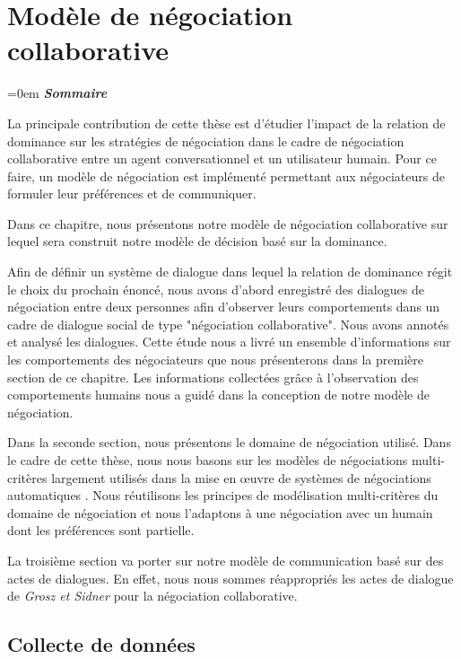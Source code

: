 	\chapter{Modèle de négociation collaborative}
	\label{chap:chap3}
	\begingroup
	\parindent=0em
	\emph{\textbf{Sommaire}}
	\localtableofcontents 
	\clearpage
	\endgroup
	
	La principale contribution de cette thèse est d'étudier l'impact de la relation de dominance sur les stratégies de négociation dans le cadre de négociation collaborative entre un agent conversationnel et un utilisateur humain. 
	Pour ce faire, un modèle de négociation est implémenté permettant aux négociateurs de formuler leur préférences et de communiquer. 
	
	Dans ce chapitre, nous présentons notre modèle de négociation collaborative sur lequel sera construit notre modèle de décision basé sur la dominance. 
	
	Afin de définir un système de dialogue dans lequel la relation de dominance régit le choix du prochain énoncé, nous avons d'abord enregistré des dialogues de négociation entre deux personnes afin d'observer leurs comportements dans un cadre de dialogue social de type "négociation collaborative". Nous avons annotés et analysé les dialogues. Cette étude nous a livré un ensemble d'informations sur les comportements des négociateurs que nous présenterons dans la première section de ce chapitre. 
	Les informations collectées grâce à l'observation des comportements humains nous a guidé dans la conception de notre modèle de négociation.
	
	Dans la seconde section, nous présentons le domaine de négociation utilisé. Dans le cadre de cette thèse, nous nous basons sur les modèles de négociations multi-critères largement utilisés dans la mise en œuvre de systèmes de négociations automatiques \cite{jonker2007agent,lai2004literature,lai2008decentralized}. Nous réutilisons les principes de modélisation multi-critères du domaine de négociation et nous l'adaptons à une négociation avec un humain dont les préférences sont partielle.  
	
	La troisième section va porter sur notre modèle de communication basé sur des actes de dialogues. En effet, nous nous sommes réappropriés les actes de dialogue de \emph{Grosz et Sidner} \cite{grosz1986attention} pour la négociation collaborative.
	
	
	 \section{Collecte de données}
	
